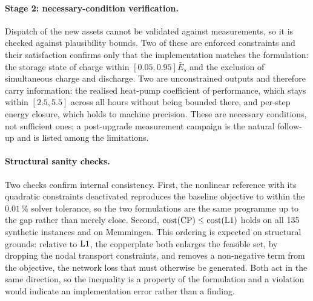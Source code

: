 \paragraph{Stage 2: necessary-condition verification.}
Dispatch of the new assets cannot be validated against measurements, so it is checked
against plausibility bounds. Two of these are enforced constraints and their satisfaction
confirms only that the implementation matches the formulation: the storage state of charge
within $[0.05, 0.95]\bar{E}_s$ and the exclusion of simultaneous charge and discharge. Two
are unconstrained outputs and therefore carry information: the realised heat-pump
coefficient of performance, which stays within $[2.5, 5.5]$ across all hours without being
bounded there, and per-step energy closure, which holds to machine precision. These are
necessary conditions, not sufficient ones; a post-upgrade measurement campaign is the
natural follow-up and is listed among the limitations.

\paragraph{Structural sanity checks.}
Two checks confirm internal consistency. First, the nonlinear reference with its quadratic
constraints deactivated reproduces the baseline objective to within the $0.01$\,\% solver
tolerance, so the two formulations are the same programme up to the gap rather than merely
close. Second, $\mathrm{cost}(\mathrm{CP}) \le \mathrm{cost}(\mathrm{L1})$ holds on all 135 synthetic
instances and on Memmingen. This ordering is expected on structural grounds: relative to
$\mathrm{L1}$, the copperplate both enlarges the feasible set, by dropping the nodal transport
constraints, and removes a non-negative term from the objective, the network loss that must
otherwise be generated. Both act in the same direction, so the inequality is a property of
the formulation and a violation would indicate an implementation error rather than a finding.